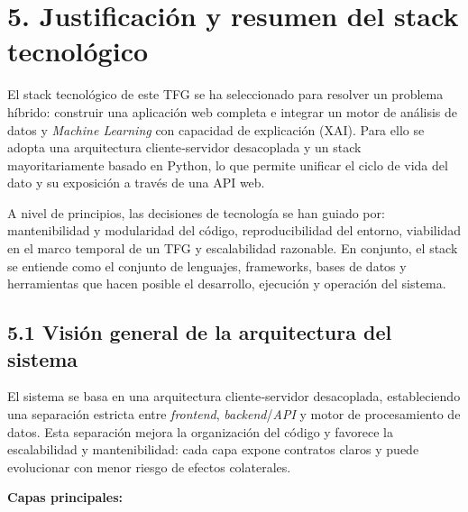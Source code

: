 \section*{5. Justificación y resumen del stack tecnológico}

El stack tecnológico de este TFG se ha seleccionado para resolver un problema 
híbrido: construir una aplicación web completa e
integrar un motor de análisis de datos y \textit{Machine Learning} con capacidad de 
explicación (XAI). Para ello se adopta una arquitectura cliente‑servidor desacoplada 
y un stack mayoritariamente basado en Python, lo que permite unificar el ciclo de 
vida del dato y su exposición a través de 
una API web.

A nivel de principios, las decisiones de tecnología se han guiado por: 
mantenibilidad y modularidad del código, reproducibilidad del entorno, 
viabilidad en el marco temporal de un TFG y escalabilidad razonable. En 
conjunto, el stack se entiende como el conjunto de lenguajes, frameworks, bases 
de datos y herramientas que hacen posible el desarrollo, ejecución y operación 
del sistema.

\subsection{5.1 Visión general de la arquitectura del sistema}

El sistema se basa en una arquitectura cliente‑servidor desacoplada, estableciendo 
una separación estricta entre \textit{frontend}, \textit{backend}/\textit{API} y motor de procesamiento de 
datos. Esta separación mejora la organización del código y favorece la escalabilidad 
y mantenibilidad: cada capa expone contratos claros y puede evolucionar con menor 
riesgo de efectos colaterales.

\textbf{Capas principales:}


